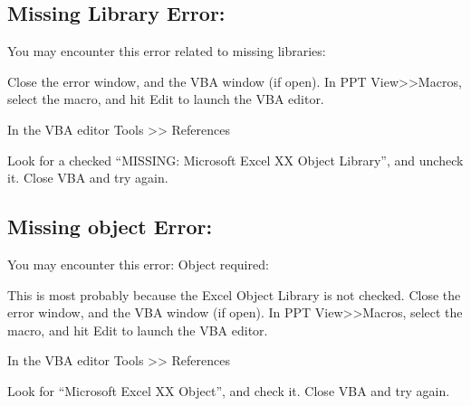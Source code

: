 \documentclass[
]{article}
\begin{document}
\hypertarget{missing-library-error}{%
\subsection{Missing Library Error:}\label{missing-library-error}}

You may encounter this error related to missing libraries:

Close the error window, and the VBA window (if open). In PPT View\textgreater\textgreater Macros, select the macro, and hit Edit to launch the VBA editor.

In the VBA editor Tools \textgreater\textgreater{} References

Look for a checked ``MISSING: Microsoft Excel XX Object Library'', and uncheck it. Close VBA and try again.

\hypertarget{missing-object-error}{%
\subsection{Missing object Error:}\label{missing-object-error}}

You may encounter this error: Object required:

This is most probably because the Excel Object Library is not checked. Close the error window, and the VBA window (if open). In PPT View\textgreater\textgreater Macros, select the macro, and hit Edit to launch the VBA editor.

In the VBA editor Tools \textgreater\textgreater{} References

Look for ``Microsoft Excel XX Object'', and check it. Close VBA and try again.
\end{document}
